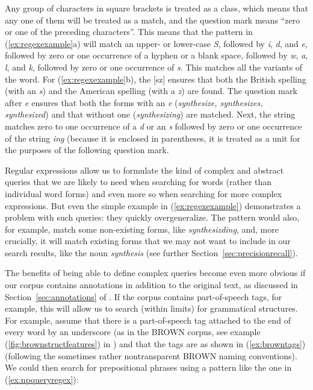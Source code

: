 Any group of characters in square brackets is treated as a class, which means that any one of them will be treated as a match, and the question mark means ``zero or one of the preceding characters''. This means that the pattern in (\ref{ex:regexexample}a) will match an upper- or lower\hyp{}case \textit{S}, followed by \textit{i}, \textit{d}, and \textit{e}, followed by zero or one occurrence of a hyphen or a blank space, followed by \textit{w}, \textit{a}, \textit{l}, and \textit{k}, followed by zero or one occurrence of \textit{s}. This matches all the variants of the word. For (\ref{ex:regexexample}b), the [sz] ensures that both the British  spelling (with an \textit{s}) and the American  spelling (with a \textit{z}) are found. The question mark after \textit{e} ensures that both the forms with an \textit{e} (\textit{synthesize, synthesizes, synthesized}) and that without one (\textit{synthesizing}) are matched. Next, the string matches zero to one occurrence of a \textit{d} or an \textit{s} followed by zero or one occurrence of the string \textit{ing} (because it is enclosed in parentheses, it is treated as a unit for the purposes of the following question mark.

Regular expressions allow us to formulate the kind of complex and abstract queries  that we are likely to need when searching for words (rather than individual word forms) and even more so when searching for more complex expressions. But even the simple example in (\ref{ex:regexexample}) demonstrates a problem with such queries: they quickly overgeneralize. The pattern would also, for example, match some non\hyp{}existing forms, like \textit{synthesizding}, and, more crucially, it will match existing forms that we may not want to include in our search results, like the noun  \textit{synthesis} (see further Section~\ref{sec:precisionrecall}).

The benefits of being able to define complex queries  become even more obvious if our corpus contains annotations  in addition to the original text, as discussed in Section~\ref{sec:annotations} of . If the corpus contains part\hyp{}of\hyp{}speech tags, for example, this will allow us to search (within limits) for grammatical structures. For example, assume that there is a part\hyp{}of\hyp{}speech tag  attached to the end of every word by an underscore (as in the BROWN  corpus, see example (\ref{fig:brownstructfeatures}) in ) and that the tags are as shown in (\ref{ex:browntags}) (following the sometimes rather nontransparent BROWN  naming conventions). We could then search for prepositional  phrases using a pattern like the one in  (\ref{ex:npqueryregex}):


